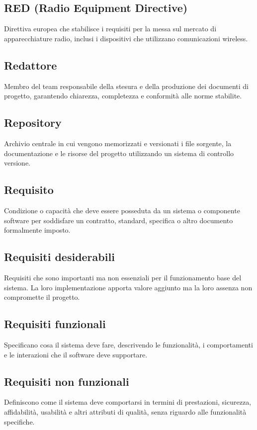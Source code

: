 \documentclass[a4paper,11pt]{article}
\begin{document}
\subsection{RED (Radio Equipment Directive)}
Direttiva europea che stabilisce i requisiti per la messa sul mercato di apparecchiature radio, inclusi i dispositivi che utilizzano comunicazioni wireless.

\subsection{Redattore}
Membro del team responsabile della stesura e della produzione dei documenti di progetto, garantendo chiarezza, completezza e conformità alle norme stabilite.

\subsection{Repository}
Archivio centrale in cui vengono memorizzati e versionati i file sorgente, la documentazione e le risorse del progetto utilizzando un sistema di controllo versione.

\subsection{Requisito}
Condizione o capacità che deve essere posseduta da un sistema o componente software per soddisfare un contratto, standard, specifica o altro documento formalmente imposto.

\subsection{Requisiti desiderabili}
Requisiti che sono importanti ma non essenziali per il funzionamento base del sistema. La loro implementazione apporta valore aggiunto ma la loro assenza non compromette il progetto.

\subsection{Requisiti funzionali}
Specificano cosa il sistema deve fare, descrivendo le funzionalità, i comportamenti e le interazioni che il software deve supportare.

\subsection{Requisiti non funzionali}
Definiscono come il sistema deve comportarsi in termini di prestazioni, sicurezza, affidabilità, usabilità e altri attributi di qualità, senza riguardo alle funzionalità specifiche.
\end{document}
